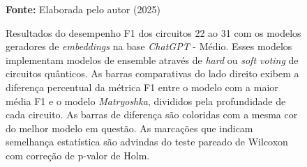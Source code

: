 \begin{figure}
\caption{Resultados do desempenho F1 dos circuitos 22 ao 31 com os modelos geradores de \textit{embeddings} na base \textit{ChatGPT} - Médio. Esses modelos implementam modelos de ensemble através de \textit{hard} ou \textit{soft voting} de circuitos quânticos. As barras comparativas do lado direito exibem a diferença percentual da métrica F1 entre o modelo com a maior média F1 e o modelo \textit{Matryoshka}, divididos pela profundidade de cada circuito. As barras de diferença são coloridas com a mesma cor do melhor modelo em questão. As marcações que indicam semelhança estatística são advindas do teste pareado de Wilcoxon com correção de p-valor de Holm.}
\label{fig:model_transformer:medium:g7}
     \centering
    \centering

      \par\medskip\ABNTEXfontereduzida\selectfont\textbf{Fonte:} Elaborada pelo autor (2025) \par\medskip
\end{figure}